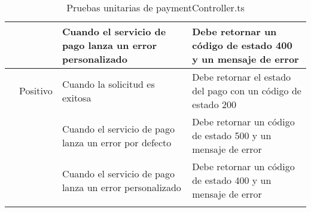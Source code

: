 \begin{small}
\begin{longtable}[H]{|>{\centering\arraybackslash}m{3cm}|>{\centering\arraybackslash}m{2cm}|>{\centering\arraybackslash}m{3cm}|>{\centering\arraybackslash}m{4cm}|}
		\cline{3-4}
		                                 &                             & Cuando el servicio de pago lanza un error personalizado & Debe retornar un código de estado 400 y un mensaje de error          \\
		\hline
		\multirow{5}{4cm}{POST /verify}  & Positivo                    & Cuando la solicitud es exitosa                          & Debe retornar el estado del pago con un código de estado 200         \\
		\cline{2-4}
		                                 & \multirow{4}{3cm}{Negativo} & Cuando el servicio de pago lanza un error por defecto   & Debe retornar un código de estado 500 y un mensaje de error          \\
		\cline{3-4}
		                                 &                             & Cuando el servicio de pago lanza un error personalizado & Debe retornar un código de estado 400 y un mensaje de error          \\
		\hline
		\caption{Pruebas unitarias de paymentController.ts}
	\end{longtable}
\end{small}

